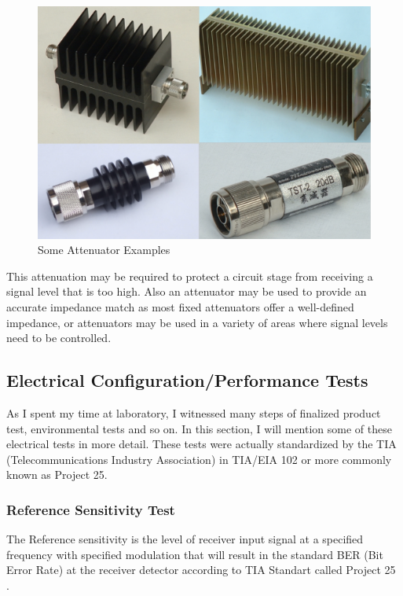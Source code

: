 \begin{figure}[H]
	\center
	\setlength{\unitlength}{\textwidth} 
	\includegraphics[width=0.5\unitlength]{attn}
	\caption{\label{fig:attn}Some Attenuator Examples }
\end{figure}

	This attenuation may be required to protect a circuit stage from receiving a signal level that is too high. Also an attenuator may be used to provide an accurate impedance match as most fixed attenuators offer a well-defined impedance, or attenuators may be used in a variety of areas where signal levels need to be controlled.


\subsection{Electrical Configuration/Performance Tests}
\- \indent
	As I spent my time at laboratory, I witnessed many steps of finalized product test, environmental tests and so on. In this section, I will mention some of these electrical tests in more detail. These tests were actually standardized by the TIA (Telecommunications Industry Association) in TIA/EIA 102 or more commonly known as Project 25.\\

\subsubsection{Reference Sensitivity Test}
\- \indent
	The Reference sensitivity is the level of receiver input signal at a specified frequency with specified modulation that will result in the standard BER (Bit Error Rate) at the receiver detector according to TIA Standart called Project 25 \cite{P25}.\\

